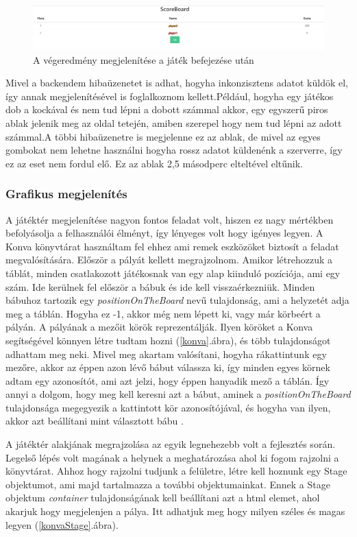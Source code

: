 \documentclass[a4paper,twoside]{article}
\begin{document}
\begin{figure}
	\caption{A végeredmény megjelenítése a játék befejezése után}
	\label{game-end}
	\centering
	\includegraphics[scale=0.35]{game-end}
\end{figure}
\FloatBarrier
Mivel a backendem hibaüzenetet is adhat, hogyha inkonzisztens adatot küldök el, így annak
megjelenítésével is foglalkoznom kellett.Például, hogyha egy játékos dob a kockával és nem tud lépni a dobott számmal akkor, egy egyszerű piros ablak
jelenik meg az oldal tetején, amiben szerepel hogy nem tud lépni az adott számmal.A többi hibaüzenetre is megjelenne ez az ablak, de mivel az egyes gombokat nem lehetne használni hogyha rossz adatot küldenénk a szerverre, így ez az eset nem fordul elő. Ez az ablak 2,5 másodperc elteltével eltűnik.
\subsubsection{Grafikus megjelenítés}

A játéktér megjelenítése nagyon fontos feladat volt, hiszen ez nagy mértékben befolyásolja a felhasználói élményt, így lényeges volt hogy igényes legyen. A Konva könyvtárat használtam fel ehhez ami remek eszközöket biztosít a feladat megvalósítására. 
Először a pályát kellett megrajzolnom. Amikor létrehozzuk a táblát, minden csatlakozott játékosnak van egy alap kiinduló pozíciója, ami egy szám. Ide kerülnek fel először a bábuk és ide kell visszaérkezniük. Minden bábuhoz tartozik egy \textit{positionOnTheBoard} nevű tulajdonság, ami a helyzetét adja meg a táblán. Hogyha ez -1, akkor még nem lépett ki, vagy már körbeért a pályán. A pályának a mezőit körök reprezentálják. Ilyen köröket a Konva segítségével könnyen létre tudtam hozni (\ref{konva}.ábra), és több tulajdonságot adhattam meg neki. Mivel meg akartam valósítani, hogyha rákattintunk egy mezőre, akkor az éppen azon lévő bábut válassza ki, így minden egyes körnek adtam egy azonosítót, ami azt jelzi, hogy éppen hanyadik mező a táblán. Így annyi a dolgom, hogy meg kell keresni azt a bábut, aminek a \textit{positionOnTheBoard} tulajdonsága megegyezik a kattintott kör azonosítójával, és hogyha van ilyen, akkor azt beállítani mint választott bábu .

A játéktér alakjának megrajzolása az egyik legnehezebb volt a fejlesztés során. Legelső lépés volt magának a helynek a meghatározása ahol ki fogom rajzolni a könyvtárat. Ahhoz hogy rajzolni tudjunk a felületre, létre kell hoznunk egy Stage objektumot, ami majd tartalmazza a további objektumainkat. Ennek a Stage objektum \textit{container} tulajdonságának kell beállítani azt a html elemet, ahol akarjuk hogy megjelenjen a pálya. Itt adhatjuk meg hogy milyen széles és magas legyen (\ref{konvaStage}.ábra). 
\end{document}
